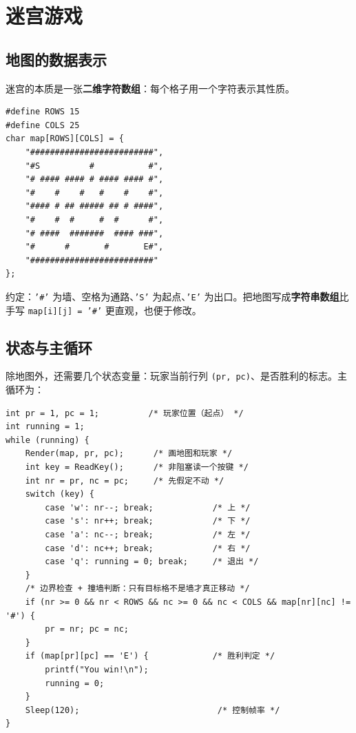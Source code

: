 
\section{迷宫游戏}
\subsection{地图的数据表示}
迷宫的本质是一张\textbf{二维字符数组}：每个格子用一个字符表示其性质。
\begin{lstlisting}
#define ROWS 15
#define COLS 25
char map[ROWS][COLS] = {
    "#########################",
    "#S          #           #",
    "# #### #### # #### #### #",
    "#    #    #   #    #    #",
    "#### # ## ##### ## # ####",
    "#    #  #     #  #      #",
    "# ####  #######  #### ###",
    "#      #       #       E#",
    "#########################"
};
\end{lstlisting}
约定：\texttt{'\#'} 为墙、空格为通路、\texttt{'S'} 为起点、\texttt{'E'} 为出口。把地图写成\textbf{字符串数组}比手写 \texttt{map[i][j] = '\#'} 更直观，也便于修改。

\subsection{状态与主循环}
除地图外，还需要几个状态变量：玩家当前行列 \texttt{(pr, pc)}、是否胜利的标志。主循环为：
\begin{lstlisting}
int pr = 1, pc = 1;          /* 玩家位置（起点） */
int running = 1;
while (running) {
    Render(map, pr, pc);      /* 画地图和玩家 */
    int key = ReadKey();      /* 非阻塞读一个按键 */
    int nr = pr, nc = pc;     /* 先假定不动 */
    switch (key) {
        case 'w': nr--; break;            /* 上 */
        case 's': nr++; break;            /* 下 */
        case 'a': nc--; break;            /* 左 */
        case 'd': nc++; break;            /* 右 */
        case 'q': running = 0; break;     /* 退出 */
    }
    /* 边界检查 + 撞墙判断：只有目标格不是墙才真正移动 */
    if (nr >= 0 && nr < ROWS && nc >= 0 && nc < COLS && map[nr][nc] != '#') {
        pr = nr; pc = nc;
    }
    if (map[pr][pc] == 'E') {             /* 胜利判定 */
        printf("You win!\n");
        running = 0;
    }
    Sleep(120);                            /* 控制帧率 */
}
\end{lstlisting}

